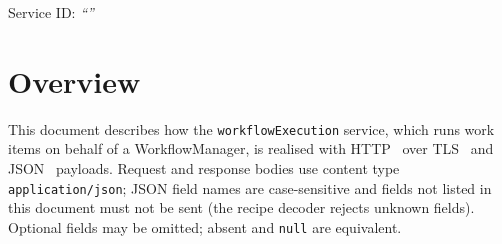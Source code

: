 \documentclass[a4paper]{arrowhead}
\begin{document}
\ArrowheadSetup

\begin{center}
  \vspace*{1cm}
  \huge{\arrowtitle}

  \vspace*{0.2cm}
  \LARGE{\arrowtype}
  \vspace*{1cm}

  \Large{Service ID: \textit{``\arrowid''}}
  \vspace*{\fill}

  

  \vspace*{1cm}
  \vspace*{\fill}

  \begin{abstract}
    This document describes the HTTP/TLS/JSON interface of the \texttt{workflow\allowbreak{}Execution} service of the Eclipse Arrowhead workflow support systems, service version 1.0.0, documentation edition 5.4.0. It realises the abstract operations of the \texttt{workflow\allowbreak{}Execution} SD.
  \end{abstract}

  \vspace*{1cm}
\end{center}

\newpage

\tableofcontents
\newpage

\section{Overview}
\label{sec:overview}
This document describes how the \texttt{workflow\allowbreak{}Execution} service, which runs work items on behalf of a WorkflowManager, is realised with HTTP~\cite{rfc9110}
over TLS~\cite{rfc8446} and JSON~\cite{rfc8259} payloads. Request and response bodies use content type
\texttt{application/\allowbreak{}json}; JSON field names are case-sensitive and fields not listed in this document must not be sent
(the recipe decoder rejects unknown fields). Optional fields may be omitted; absent and \texttt{null} are equivalent.
\end{document}
